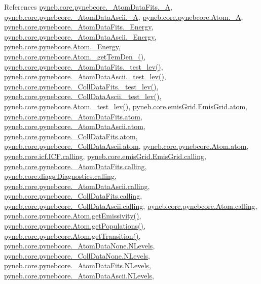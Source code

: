 References \hyperlink{pynebcore_8py_source_l00093}{pyneb.\+core.\+pynebcore.\+\_\+\+Atom\+Data\+Fits.\+\_\+\+A}, \hyperlink{pynebcore_8py_source_l00402}{pyneb.\+core.\+pynebcore.\+\_\+\+Atom\+Data\+Ascii.\+\_\+\+A}, \hyperlink{pynebcore_8py_source_l01256}{pyneb.\+core.\+pynebcore.\+Atom.\+\_\+\+A}, \hyperlink{pynebcore_8py_source_l00094}{pyneb.\+core.\+pynebcore.\+\_\+\+Atom\+Data\+Fits.\+\_\+\+Energy}, \hyperlink{pynebcore_8py_source_l00400}{pyneb.\+core.\+pynebcore.\+\_\+\+Atom\+Data\+Ascii.\+\_\+\+Energy}, \hyperlink{pynebcore_8py_source_l01257}{pyneb.\+core.\+pynebcore.\+Atom.\+\_\+\+Energy}, \hyperlink{pynebcore_8py_source_l01803}{pyneb.\+core.\+pynebcore.\+Atom.\+\_\+get\+Tem\+Den\+\_()}, \hyperlink{pynebcore_8py_source_l00171}{pyneb.\+core.\+pynebcore.\+\_\+\+Atom\+Data\+Fits.\+\_\+test\+\_\+lev()}, \hyperlink{pynebcore_8py_source_l00435}{pyneb.\+core.\+pynebcore.\+\_\+\+Atom\+Data\+Ascii.\+\_\+test\+\_\+lev()}, \hyperlink{pynebcore_8py_source_l00660}{pyneb.\+core.\+pynebcore.\+\_\+\+Coll\+Data\+Fits.\+\_\+test\+\_\+lev()}, \hyperlink{pynebcore_8py_source_l01026}{pyneb.\+core.\+pynebcore.\+\_\+\+Coll\+Data\+Ascii.\+\_\+test\+\_\+lev()}, \hyperlink{pynebcore_8py_source_l01459}{pyneb.\+core.\+pynebcore.\+Atom.\+\_\+test\+\_\+lev()}, \hyperlink{emis_grid_8py_source_l00048}{pyneb.\+core.\+emis\+Grid.\+Emis\+Grid.\+atom}, \hyperlink{pynebcore_8py_source_l00082}{pyneb.\+core.\+pynebcore.\+\_\+\+Atom\+Data\+Fits.\+atom}, \hyperlink{pynebcore_8py_source_l00303}{pyneb.\+core.\+pynebcore.\+\_\+\+Atom\+Data\+Ascii.\+atom}, \hyperlink{pynebcore_8py_source_l00559}{pyneb.\+core.\+pynebcore.\+\_\+\+Coll\+Data\+Fits.\+atom}, \hyperlink{pynebcore_8py_source_l00909}{pyneb.\+core.\+pynebcore.\+\_\+\+Coll\+Data\+Ascii.\+atom}, \hyperlink{pynebcore_8py_source_l01164}{pyneb.\+core.\+pynebcore.\+Atom.\+atom}, \hyperlink{icf_8py_source_l00016}{pyneb.\+core.\+icf.\+I\+C\+F.\+calling}, \hyperlink{emis_grid_8py_source_l00041}{pyneb.\+core.\+emis\+Grid.\+Emis\+Grid.\+calling}, \hyperlink{pynebcore_8py_source_l00090}{pyneb.\+core.\+pynebcore.\+\_\+\+Atom\+Data\+Fits.\+calling}, \hyperlink{diags_8py_source_l00169}{pyneb.\+core.\+diags.\+Diagnostics.\+calling}, \hyperlink{pynebcore_8py_source_l00311}{pyneb.\+core.\+pynebcore.\+\_\+\+Atom\+Data\+Ascii.\+calling}, \hyperlink{pynebcore_8py_source_l00568}{pyneb.\+core.\+pynebcore.\+\_\+\+Coll\+Data\+Fits.\+calling}, \hyperlink{pynebcore_8py_source_l00918}{pyneb.\+core.\+pynebcore.\+\_\+\+Coll\+Data\+Ascii.\+calling}, \hyperlink{pynebcore_8py_source_l01175}{pyneb.\+core.\+pynebcore.\+Atom.\+calling}, \hyperlink{pynebcore_8py_source_l01716}{pyneb.\+core.\+pynebcore.\+Atom.\+get\+Emissivity()}, \hyperlink{pynebcore_8py_source_l01496}{pyneb.\+core.\+pynebcore.\+Atom.\+get\+Populations()}, \hyperlink{pynebcore_8py_source_l01406}{pyneb.\+core.\+pynebcore.\+Atom.\+get\+Transition()}, \hyperlink{pynebcore_8py_source_l00062}{pyneb.\+core.\+pynebcore.\+\_\+\+Atom\+Data\+None.\+N\+Levels}, \hyperlink{pynebcore_8py_source_l00075}{pyneb.\+core.\+pynebcore.\+\_\+\+Coll\+Data\+None.\+N\+Levels}, \hyperlink{pynebcore_8py_source_l00155}{pyneb.\+core.\+pynebcore.\+\_\+\+Atom\+Data\+Fits.\+N\+Levels}, \hyperlink{pynebcore_8py_source_l00404}{pyneb.\+core.\+pynebcore.\+\_\+\+Atom\+Data\+Ascii.\+N\+Levels}, 